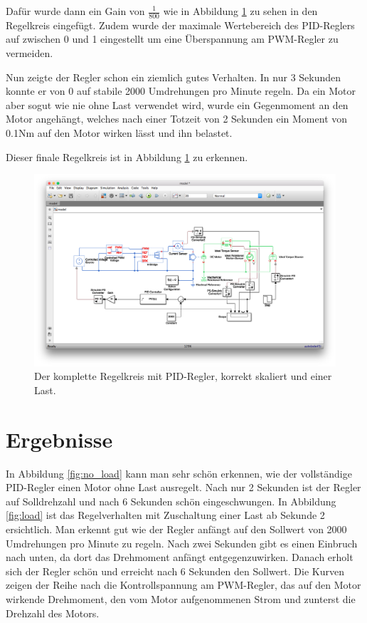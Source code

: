 \documentclass{fhnwreport} %
\begin{document}
Dafür wurde dann ein Gain von $\frac{1}{800}$ wie in Abbildung \ref{fig:total} zu sehen in den Regelkreis eingefügt. Zudem wurde der maximale Wertebereich des PID-Reglers auf zwischen 0 und 1 eingestellt um eine Überspannung am PWM-Regler zu vermeiden.

Nun zeigte der Regler schon ein ziemlich gutes Verhalten. In nur 3 Sekunden konnte er von 0 auf stabile 2000 Umdrehungen pro Minute regeln.
Da ein Motor aber sogut wie nie ohne Last verwendet wird, wurde ein Gegenmoment an den Motor angehängt, welches nach einer Totzeit von 2 Sekunden ein Moment von 0.1Nm auf den Motor wirken lässt und ihn belastet.

Dieser finale Regelkreis ist in Abbildung \ref{fig:total} zu erkennen.

\begin{figure}
\begin{center}
\includegraphics[trim={5cm 6cm 2.2cm 8cm},clip,width=1\textwidth]{total}
\caption{Der komplette Regelkreis mit PID-Regler, korrekt skaliert und einer Last.}
\label{fig:total}
\end{center}
\end{figure}

\section{Ergebnisse}

In Abbildung \ref{fig:no_load} kann man sehr schön erkennen, wie der vollständige PID-Regler einen Motor ohne Last ausregelt. Nach nur 2 Sekunden ist der Regler auf Solldrehzahl und nach 6 Sekunden schön eingeschwungen.
In Abbildung \ref{fig:load} ist das Regelverhalten mit Zuschaltung einer Last ab Sekunde 2 ersichtlich. Man erkennt gut wie der Regler anfängt auf den Sollwert von 2000 Umdrehungen pro Minute zu regeln. Nach zwei Sekunden gibt es einen Einbruch nach unten, da dort das Drehmoment anfängt entgegenzuwirken. Danach erholt sich der Regler schön und erreicht nach 6 Sekunden den Sollwert.
Die Kurven zeigen der Reihe nach die Kontrollspannung am PWM-Regler, das auf den Motor wirkende Drehmoment, den vom Motor aufgenommenen Strom und zunterst die Drehzahl des Motors.
\end{document}
